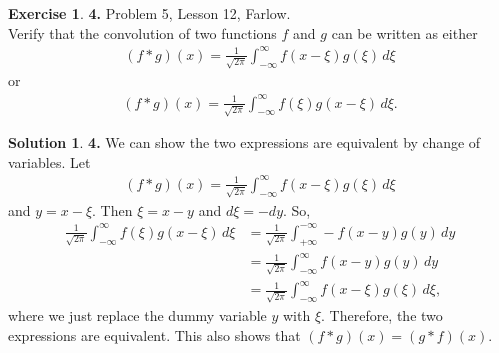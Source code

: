 \documentclass{article}
\theoremstyle{definition}
\newtheorem*{exer*}{Exercise}
\newtheorem*{sln*}{Solution}
\newcommand{\f}[2]{\frac{#1}{#2}}
\begin{document}
\newpage

\begin{exer*}\textbf{4. }Problem 5, Lesson 12, Farlow.\\
	
	Verify that the convolution of two functions $f$ and $g$ can be written as either 
	\begin{align*}
	(f\ast g)(x) = \f{1}{\sqrt{2\pi}} \int^\infty_{-\infty} f(x-\xi)g(\xi)\, d\xi
	\end{align*}
	or
	\begin{align*}
	(f\ast g)(x) = \f{1}{\sqrt{2\pi}}\int^\infty_{-\infty} f(\xi)g(x - \xi)\, d\xi.
	\end{align*}
	
	
	\begin{sln*}\textbf{4.}
	We can show the two expressions are equivalent by change of variables. Let 
	\begin{align*}
	(f\ast g)(x) = \f{1}{\sqrt{2\pi}} \int^\infty_{-\infty} f(x-\xi)g(\xi)\, d\xi
	\end{align*}
	and $y = x - \xi$. Then $\xi = x-y$ and $d\xi = -dy$. So,
	\begin{align*}
	\f{1}{\sqrt{2\pi}}\int^\infty_{-\infty} f(\xi)g(x - \xi)\, d\xi
	&= \f{1}{\sqrt{2\pi}} \int^{-\infty}_{+\infty} -f(x-y)g(y)\,dy\\
	&= \f{1}{\sqrt{2\pi}} \int^{\infty}_{-\infty} f(x-y)g(y)\,dy\\
	&= \f{1}{\sqrt{2\pi}} \int^\infty_{-\infty} f(x-\xi)g(\xi)\, d\xi,
	\end{align*}
	where we just replace the dummy variable $y$ with $\xi$. Therefore, the two expressions are equivalent. This also shows that $(f\ast g)(x) = (g\ast f)(x)$. 
	\end{sln*}
\end{exer*}

\newpage
\end{document}
